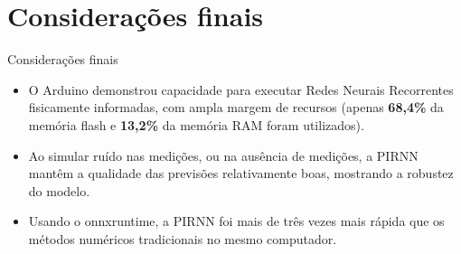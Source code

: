 \section{Considerações finais}

\begin{frame}{Considerações finais}
  \begin{itemize}
    \item O Arduino demonstrou capacidade para executar Redes Neurais Recorrentes fisicamente informadas, com ampla margem de recursos (apenas \textbf{68,4\%} da memória flash e \textbf{13,2\%} da memória RAM foram utilizados).
    \item Ao simular ruído nas medições, ou na ausência de medições, a PIRNN mantêm a qualidade das previsões relativamente boas, mostrando a robustez do modelo.
    \item Usando o onnxruntime, a PIRNN foi mais de três vezes mais rápida que os métodos numéricos tradicionais no mesmo computador.
  \end{itemize}
\end{frame}
